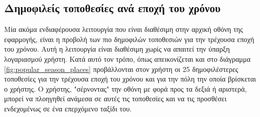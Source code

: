 \documentclass[oneside, 12pt]{book}
\begin{document}
\subsection{Δημοφιλείς τοποθεσίες ανά εποχή του χρόνου} \label{popular_places_by_season_section}
Μία ακόμα ενδιαφέρουσα λειτουργία που είναι διαθέσιμη στην αρχική 
οθόνη της εφαρμογής, είναι η προβολή των πιο δημοφιλών τοποθεσιών για 
την τρέχουσα εποχή του χρόνου. Αυτή η λειτουργία είναι διαθέσιμη χωρίς να απαιτεί την ύπαρξη λογαριασμού χρήστη.
Κατά αυτό τον τρόπο, όπως απεικονίζεται και στο διάγραμμα \ref{fig:popular_season_places} προβάλλονται στον χρήστη οι 25 δημοφιλέστερες τοποθεσίες για την τρέχουσα εποχή του χρόνου και για την πόλη την οποία βρίσκεται ο χρήστης. Ο χρήστης, "σέρνοντας" την οθόνη με φορά προς τα δεξιά ή αριστερά, μπορεί να πλοηγηθεί ανάμεσα σε αυτές τις τοποθεσίες και να τις προσθέσει ενδεχομένως σε ένα επερχόμενο ταξίδι του.
\end{document}
